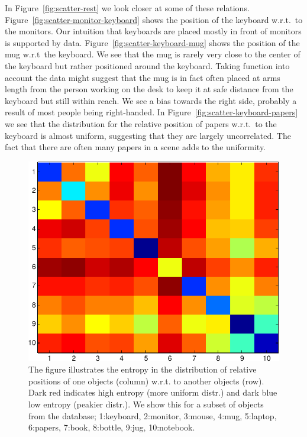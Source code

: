 \documentclass[letterpaper, 10 pt, conference]{ieeeconf}  %
\begin{document}
In Figure~\ref{fig:scatter-rest} we look closer at some of these relations. Figure~\ref{fig:scatter-monitor-keyboard} shows the position of 
the keyboard w.r.t.\ to the monitors. Our intuition that keyboards are placed mostly in front of monitors is supported by data. 
Figure~\ref{fig:scatter-keyboard-mug} shows the position of the mug w.r.t\ the keyboard. We see that the mug is rarely very close to the center of the 
keyboard but rather positioned around the keyboard. Taking function into account the data might suggest that the mug 
is in fact often placed at arms length from the person working on the desk to keep it at safe distance from the keyboard but still within 
reach. We see a bias towards the right side, probably a result of most people being right-handed. In Figure~\ref{fig:scatter-keyboard-papers} we see 
that the distribution for the relative position of papers w.r.t.\ to the keyboard is almost uniform, suggesting that they are largely uncorrelated. The fact that there are often many papers in a scene adds to the uniformity.

\begin{figure}
\begin{center}
\includegraphics[width=\linewidth]{entropy_matrix-crop}
\end{center}
\caption{The figure illustrates the entropy in the distribution of relative positions of one objects (column) w.r.t. to another objects (row). Dark red indicates high entropy (more uniform distr.) and dark blue low entropy (peakier distr.). We show this for a subset of objects from the database; 1:keyboard, 2:monitor, 3:mouse, 4:mug, 5:laptop, 6:papers, 7:book, 8:bottle, 9:jug, 10:notebook. }
\label{fig:entropy}
\end{figure}
\end{document}
